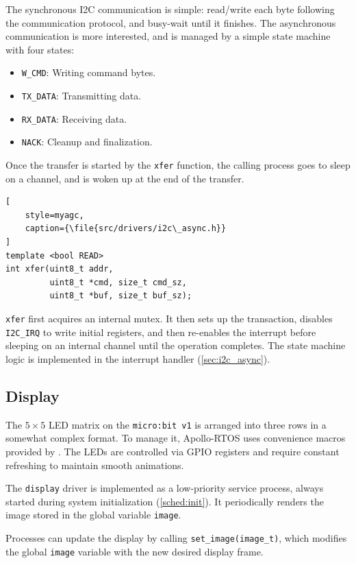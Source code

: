The synchronous I2C communication is simple: read/write each byte following the
communication protocol, and busy-wait until it finishes. The asynchronous communication
is more interested, and is managed by a simple state machine with four states:
\begin{itemize}
    \item \lstinline[style=myagc]|W_CMD|: Writing command bytes.
    \item \lstinline[style=myagc]|TX_DATA|: Transmitting data.
    \item \lstinline[style=myagc]|RX_DATA|: Receiving data.
    \item \lstinline[style=myagc]|NACK|: Cleanup and finalization.
\end{itemize}

\ifsubmission\newpage\fi
Once the transfer is started by the \lstinline[style=myagc]|xfer| function, the calling
process goes to sleep on a channel, and is woken up at the end of the transfer.
\begin{lstlisting}[
    style=myagc,
    caption={\file{src/drivers/i2c\_async.h}}
]
template <bool READ>
int xfer(uint8_t addr,
         uint8_t *cmd, size_t cmd_sz, 
         uint8_t *buf, size_t buf_sz);
\end{lstlisting}

\lstinline[style=myagc]|xfer| first acquires an internal mutex. It then sets up the
transaction, disables \lstinline[style=myagc]|I2C_IRQ| to write initial registers, and
then re-enables the interrupt before sleeping on an internal channel until the
operation completes. The state machine logic is implemented in the interrupt handler
(\autoref{sec:i2c_async}).


\subsection{Display}
\label{proc:display}

The \(5 \times 5\) LED matrix on the \texttt{micro:bit v1} is arranged into three rows
in a somewhat complex format. To manage it, Apollo-RTOS uses convenience macros
provided by \citet{microbian}. The LEDs are controlled via GPIO registers and require
constant refreshing to maintain smooth animations.

The \lstinline[style=myagc]|display| driver is implemented as a low-priority service
process, always started during system initialization (\autoref{sched:init}). It
periodically renders the image stored in the global variable
\lstinline[style=myagc]|image|.

Processes can update the display by calling
\lstinline[style=myagc]|set_image(image_t)|, which modifies the global
\lstinline[style=myagc]|image| variable with the new desired display frame.

